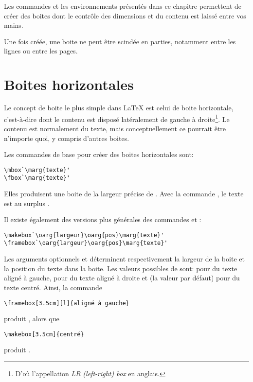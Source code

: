 Les commandes et les environnements présentés dans ce chapitre
permettent de créer des boites dont le contrôle des dimensions et
du contenu est laissé entre vos mains.

Une fois créée, une boite ne peut être scindée en parties, notamment
entre les lignes ou entre les pages.


\section{Boites horizontales}
\label{sec:boites:lrbox}

Le concept de boite le plus simple dans {\LaTeX} est celui de boite
horizontale, c'est-à-dire dont le contenu est disposé latéralement de
gauche à droite\footnote{%
  D'où l'appellation \emph{LR (left-right) box} en anglais.}. %
Le contenu est normalement du texte, mais conceptuellement ce pourrait
être n'importe quoi, y compris d'autres boites.

Les commandes de base pour créer des boites horizontales sont:
\begin{lstlisting}
\mbox`\marg{texte}'
\fbox`\marg{texte}'
\end{lstlisting}
Elles produisent une boite de la largeur précise de . Avec
la commande \cmd{\fbox}, le texte est au surplus .

Il existe également des versions plus générales des commandes
\cmd{\mbox} et \cmd{\fbox}:
\begin{lstlisting}
\makebox`\oarg{largeur}\oarg{pos}\marg{texte}'
\framebox`\oarg{largeur}\oarg{pos}\marg{texte}'
\end{lstlisting}
Les arguments optionnels  et  déterminent
respectivement la largeur de la boite et la position du texte
dans la boite. Les valeurs possibles de  sont:  pour
du texte aligné à gauche,  pour du texte aligné à droite et
 (la valeur par défaut) pour du texte centré. Ainsi, la commande
\begin{lstlisting}
\framebox[3.5cm][l]{aligné à gauche}
\end{lstlisting}
produit , alors que
\begin{lstlisting}
\makebox[3.5cm]{centré}
\end{lstlisting}
produit .



